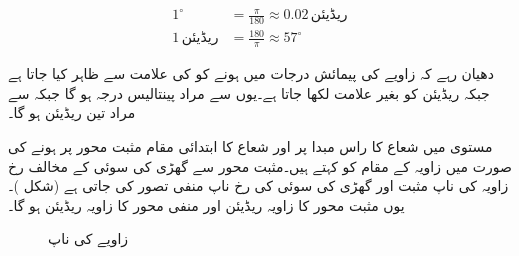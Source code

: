\begin{align*}
1^{\circ}&=\frac{\pi}{180}\approx 0.02 \,\text{ریڈیئن}\\
1\,\text{ریڈیئن}&=\frac{180}{\pi}\approx 57^{\circ}
\end{align*}

دھیان رہے کہ زاویے کی پیمائش درجات میں ہونے کو  کی علامت سے ظاہر کیا جاتا ہے جبکہ ریڈیئن کو بغیر علامت لکھا جاتا ہے۔یوں    سے مراد پینتالیس درجہ ہو گا جبکہ  سے مراد تین ریڈیئن ہو گا۔

 مستوی میں شعاع کا راس مبدا پر اور شعاع کا ابتدائی مقام مثبت  محور پر ہونے کی صورت میں زاویہ کے مقام کو   کہتے ہیں۔مثبت  محور سے گھڑی کی  سوئی کے مخالف رخ زاویہ کی ناپ مثبت اور گھڑی کی سوئی کی رخ ناپ منفی تصور کی جاتی ہے (شکل )۔یوں مثبت  محور کا زاویہ  ریڈیئن اور منفی  محور کا زاویہ  ریڈیئن  ہو گا۔
\begin{figure}
\centering
{}
\caption{زاویے کی ناپ}
\label{شکل_ابتدا_زاویہ_کی_ناپ}
\end{figure}  


